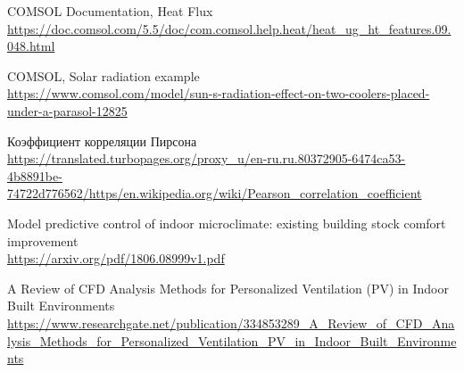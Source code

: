 \documentclass[a4paper,article,14pt]{extarticle}
\begin{document}
\begin{thebibliography}{1}
 COMSOL Documentation, Heat Flux\\
\url{https://doc.comsol.com/5.5/doc/com.comsol.help.heat/heat_ug_ht_features.09.048.html}

 COMSOL, Solar radiation example\\
\url{https://www.comsol.com/model/sun-s-radiation-effect-on-two-coolers-placed-under-a-parasol-12825}

 Коэффициент корреляции Пирсона\\
\url{https://translated.turbopages.org/proxy_u/en-ru.ru.80372905-6474ca53-4b8891be-74722d776562/https/en.wikipedia.org/wiki/Pearson_correlation_coefficient}



 Model predictive control of indoor microclimate: existing building stock comfort improvement\\
\url{https://arxiv.org/pdf/1806.08999v1.pdf}

 A Review of CFD Analysis Methods for Personalized Ventilation (PV) in Indoor Built Environments\\
\url{https://www.researchgate.net/publication/334853289_A_Review_of_CFD_Analysis_Methods_for_Personalized_Ventilation_PV_in_Indoor_Built_Environments}
\end{thebibliography}
\end{document}
